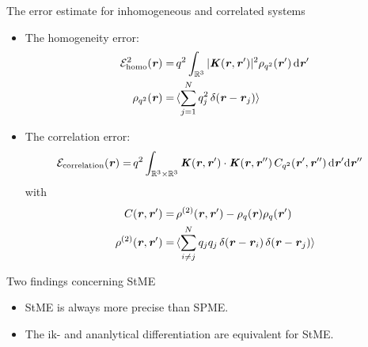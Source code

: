 \documentclass{beamer}
\newcommand{\blackc}[1]{{\color{black} #1}}
\newcommand{\bluec}[1]{{\color{blue} #1}}
\newcommand{\vect}[1]{\textbf{\textit{#1}}}
\renewcommand{\d}[1]{\textrm{#1}}
\begin{document}
\begin{frame}{The error estimate for inhomogeneous and correlated systems}
  \begin{itemize}
  \item <1-> The homogeneity error:
    \bluec{
      \begin{align*}
        {\mathcal E^2_{\textrm{homo}}(\vect r)}
        = &\,
        q^2\int_{\mathbb R^3}\vert\vect K(\vect r, \vect r')\vert^2\rho_{q^2}(\vect r')\,\d d\vect r'  \\
        \rho_{q^2}(\vect r) =&\,
        \langle \sum_{j=1}^Nq^2_j\,\delta(\vect r - \vect r_j) \rangle
      \end{align*}}    
  \item <2-> The correlation error:
    \bluec{
      \begin{align*}
        \mathcal E_{\textrm{correlation}}(\vect r)
        =&\,
        q^2\int_{\mathbb R^3\times\mathbb R^3}\vect K(\vect r, \vect r')\cdot\vect K(\vect r, \vect r'')\,C_{q^2}(\vect r', \vect r'')\,\d d\vect r'\d d\vect r''
      \end{align*}
      \blackc{with}
      \begin{align*}
        C (\vect r, \vect r') =&\,
        \rho^{(2)}(\vect r, \vect r') -
        \rho_{q}(\vect r)\rho_{q}(\vect r') \\
        \rho^{(2)}(\vect r, \vect r') =&\,
        \langle \sum_{i\neq j}^Nq_jq_j\,\delta(\vect r - \vect r_i)\,\delta(\vect r - \vect r_j) \rangle
      \end{align*}
    }
  \end{itemize}
\end{frame}


\begin{frame}{Two findings concerning StME}
  \begin{itemize}
    \vfill
  \item <1-> StME is always more precise than SPME.
    \vfill
  \item <2-> The ik- and ananlytical differentiation are equivalent for StME.
    \vfill
  \end{itemize}
\end{frame}
\end{document}
